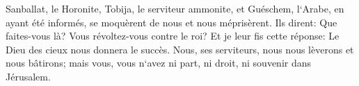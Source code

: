 \verse Sanballat, le Horonite, Tobija, le serviteur ammonite, et Guéschem, l`Arabe, en ayant été informés, se moquèrent de nous et nous méprisèrent. Ils dirent: Que faites-vous là? Vous révoltez-vous contre le roi? 
\verse Et je leur fis cette réponse: Le Dieu des cieux nous donnera le succès. Nous, ses serviteurs, nous nous lèverons et nous bâtirons; mais vous, vous n`avez ni part, ni droit, ni souvenir dans Jérusalem. 

\chapter{}

